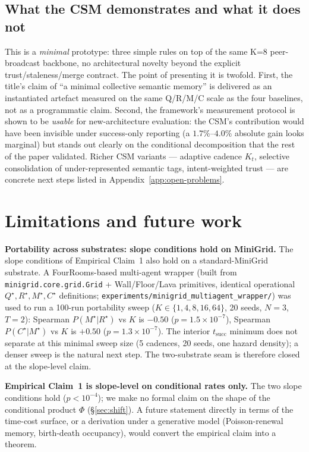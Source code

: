 \documentclass{article}
\begin{document}
\subsection{What the CSM demonstrates and what it does not}
This is a \emph{minimal} prototype: three simple rules on top of the same K=8 peer-broadcast backbone, no architectural novelty beyond the explicit trust/staleness/merge contract. The point of presenting it is twofold. First, the title's claim of ``a minimal collective semantic memory'' is delivered as an instantiated artefact measured on the same Q/R/M/C scale as the four baselines, not as a programmatic claim. Second, the framework's measurement protocol is shown to be \emph{usable} for new-architecture evaluation: the CSM's contribution would have been invisible under success-only reporting (a $1.7\%$--$4.0\%$ absolute gain looks marginal) but stands out clearly on the conditional decomposition that the rest of the paper validated. Richer CSM variants --- adaptive cadence $K_t$, selective consolidation of under-represented semantic tags, intent-weighted trust --- are concrete next steps listed in Appendix~\ref{app:open-problems}.

\section{Limitations and future work}
\label{sec:limitations}

\textbf{Portability across substrates: slope conditions hold on MiniGrid.} The slope conditions of Empirical Claim~1 also hold on a standard-MiniGrid substrate. A FourRooms-based multi-agent wrapper (built from \texttt{minigrid.core.grid.Grid} + Wall/Floor/Lava primitives, identical operational $Q^\star,R^\star,M^\star,C^\star$ definitions; \texttt{experiments/minigrid\_multiagent\_wrapper/}) was used to run a 100-run portability sweep ($K{\in}\{1,4,8,16,64\}$, 20 seeds, $N{=}3$, $T{=}2$): Spearman $P(M^\star|R^\star)$ vs $K$ is $-0.50$ ($p{=}1.5{\times}10^{-7}$), Spearman $P(C^\star|M^\star)$ vs $K$ is $+0.50$ ($p{=}1.3{\times}10^{-7}$). The interior $t_{\mathrm{succ}}$ minimum does not separate at this minimal sweep size (5 cadences, 20 seeds, one hazard density); a denser sweep is the natural next step. The two-substrate seam is therefore closed at the slope-level claim.

\textbf{Empirical Claim~1 is slope-level on conditional rates only.} The two slope conditions hold ($p<10^{-4}$); we make no formal claim on the shape of the conditional product $\Phi$ (\S\ref{sec:shift}). A future statement directly in terms of the time-cost surface, or a derivation under a generative model (Poisson-renewal memory, birth-death occupancy), would convert the empirical claim into a theorem.
\end{document}
